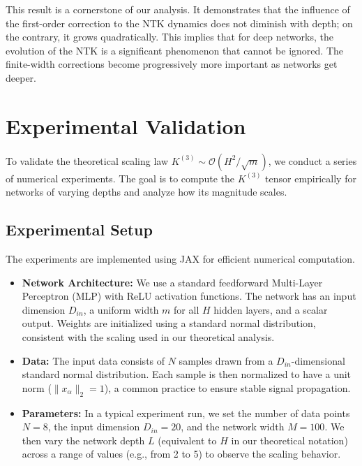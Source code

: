 \documentclass{article}
\newcommand{\Order}{\mathcal{O}}
\begin{document}
This result is a cornerstone of our analysis. It demonstrates that the influence of the first-order correction to the NTK dynamics does not diminish with depth; on the contrary, it grows quadratically. This implies that for deep networks, the evolution of the NTK is a significant phenomenon that cannot be ignored. The finite-width corrections become progressively more important as networks get deeper.

\newpage
\section{Experimental Validation}

To validate the theoretical scaling law $K^{(3)} \sim \Order(H^2/\sqrt{m})$, we conduct a series of numerical experiments. The goal is to compute the $K^{(3)}$ tensor empirically for networks of varying depths and analyze how its magnitude scales.

\subsection{Experimental Setup}

The experiments are implemented using JAX for efficient numerical computation.

\begin{itemize}
    \item \textbf{Network Architecture:} We use a standard feedforward Multi-Layer Perceptron (MLP) with ReLU activation functions. The network has an input dimension $D_{in}$, a uniform width $m$ for all $H$ hidden layers, and a scalar output. Weights are initialized using a standard normal distribution, consistent with the scaling used in our theoretical analysis.

    \item \textbf{Data:} The input data consists of $N$ samples drawn from a $D_{in}$-dimensional standard normal distribution. Each sample is then normalized to have a unit norm ($\|x_\alpha\|_2 = 1$), a common practice to ensure stable signal propagation.

    \item \textbf{Parameters:} In a typical experiment run, we set the number of data points $N=8$, the input dimension $D_{in}=20$, and the network width $M=100$. We then vary the network depth $L$ (equivalent to $H$ in our theoretical notation) across a range of values (e.g., from 2 to 5) to observe the scaling behavior.
\end{itemize}
\end{document}
